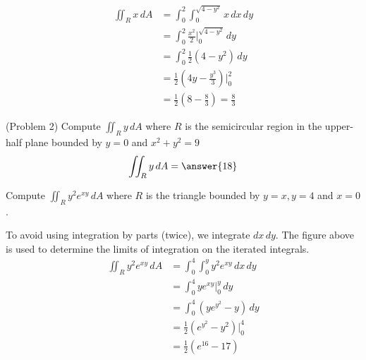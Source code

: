 \documentclass[handout]{ximera}
\begin{document}
\begin{example}[Example 2]
\begin{align*}
\iint_R x \, dA & = \int_0^2 \int_0^{\sqrt{4 - y^2}} x \, dx \, dy\\
                 & = \int_0^2  \frac{x^2}{2} \bigg|_{0}^{\sqrt{4 - y^2}} \, dy\\
                 & = \int_0^2  \frac12(4-y^2) \, dy\\
                 &= \frac12 \left(4y - \frac{y^3}{3}\right)  \bigg|_0^2\\
                 &= \frac12 \left(8 - \frac83\right) = \frac{8}{3}
\end{align*} 


\end{example}

\begin{problem}(Problem 2)
Compute $\iint_R y \, dA$ where $R$ is the semicircular region in the upper-half plane bounded by $y=0$ and $x^2 + y^2 = 9$
\[
\iint_R y \, dA = \answer{18}
\]
\end{problem}


\begin{example}[Example 3]
Compute $\iint_R y^2 e^{xy} \, dA$ where $R$ is the triangle bounded by $y = x, y=4$ and $x=0$.\\

\begin{image}
\end{image}

To avoid using integration by parts (twice), we integrate $dx\, dy$.  
The figure above is used to determine the limits of integration on the iterated integrals.
\begin{align*}
\iint_R y^2 e^{xy} \, dA & = \int_0^4 \int_0^{y} y^2 e^{xy} \, dx \, dy\\
                 & = \int_0^4 y e^{xy} \bigg|_{0}^{y} \, dy\\
                 & = \int_0^4  \left(ye^{y^2} - y \right)\, dy\\
                 &= \frac12 \left(e^{y^2} - y^2\right) \bigg|_0^4\\
                 &= \frac12 \left(e^{16} - 17\right)
\end{align*} 

\end{example}
\end{document}
